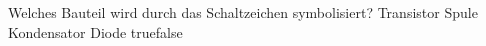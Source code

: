     {Welches Bauteil wird durch das Schaltzeichen symbolisiert?}
    {Transistor}
    {Spule}
    {Kondensator}
    {Diode}
    {true}{false}